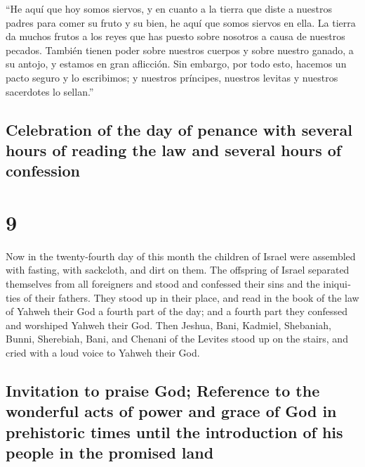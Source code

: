\begin{paracol}{2}
 ``He aquí que hoy somos siervos, y en cuanto a la tierra
que diste a nuestros padres para comer su fruto y su bien, he aquí que
somos siervos en ella.  La tierra da muchos frutos a los
reyes que has puesto sobre nosotros a causa de nuestros pecados. También
tienen poder sobre nuestros cuerpos y sobre nuestro ganado, a su antojo,
y estamos en gran aflicción.  Sin embargo, por todo esto,
hacemos un pacto seguro y lo escribimos; y nuestros príncipes, nuestros
levitas y nuestros sacerdotes lo sellan.''

\switchcolumn
\begin{otherlanguage}{english}

\hypertarget{celebration-of-the-day-of-penance-with-several-hours-of-reading-the-law-and-several-hours-of-confession}{%
\subsection{Celebration of the day of penance with several hours of
reading the law and several hours of
confession}\label{celebration-of-the-day-of-penance-with-several-hours-of-reading-the-law-and-several-hours-of-confession}}

\hypertarget{section-17}{%
\section{9}\label{section-17}}

 Now in the twenty-fourth day of this month the children
of Israel were assembled with fasting, with sackcloth, and dirt on them.
 The offspring of Israel separated themselves from all
foreigners and stood and confessed their sins and the iniquities of
their fathers.  They stood up in their place, and read in
the book of the law of Yahweh their God a fourth part of the day; and a
fourth part they confessed and worshiped Yahweh their God.
 Then Jeshua, Bani, Kadmiel, Shebaniah, Bunni, Sherebiah,
Bani, and Chenani of the Levites stood up on the stairs, and cried with
a loud voice to Yahweh their God.

\hypertarget{invitation-to-praise-god-reference-to-the-wonderful-acts-of-power-and-grace-of-god-in-prehistoric-times-until-the-introduction-of-his-people-in-the-promised-land}{%
\subsection{Invitation to praise God; Reference to the wonderful acts of
power and grace of God in prehistoric times until the introduction of
his people in the promised
land}\label{invitation-to-praise-god-reference-to-the-wonderful-acts-of-power-and-grace-of-god-in-prehistoric-times-until-the-introduction-of-his-people-in-the-promised-land}}


\end{otherlanguage}
\end{paracol}
